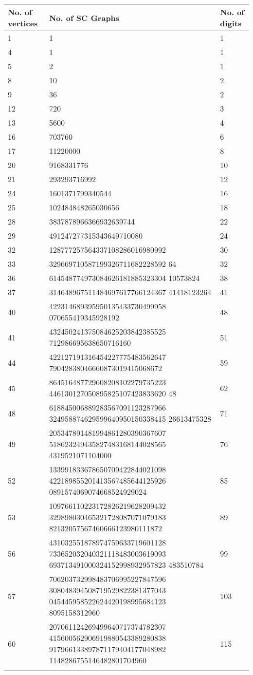 \documentclass[12pt,conference]{IEEEtran}
\begin{document}
\newpage
\fontsize{10}{12} \selectfont
\begin{center} 
\begin{tabular}{ |p{1.1cm} | p{5.3cm} | p{1.1cm}|}
  \hline
  No. of vertices& No. of SC Graphs & No. of digits \\ \hline
1 & 1 & 1 \\ \hline
4 & 1 & 1 \\ \hline
5 & 2 & 1 \\ \hline
8 & 10 & 2 \\ \hline
9 & 36 & 2 \\ \hline
12 & 720 & 3 \\ \hline
13 & 5600 & 4 \\ \hline
16 & 703760 & 6 \\ \hline
17 & 11220000 & 8 \\ \hline
20 & 9168331776 & 10 \\ \hline
21 & 293293716992 & 12 \\ \hline
24 & 1601371799340544 & 16 \\ \hline
25 & 102484848265030656 & 18 \\ \hline
28 & 3837878966366932639744 & 22 \\ \hline
29 & 491247277315343649710080 & 24 \\ \hline
32 & 128777257564337108286016980992  & 30 \\ \hline
33 & 329669710587199326711682228592 64 & 32 \\ \hline
36 & 614548774973084626181885323304 10573824 & 38 \\ \hline
37 & 314648967511484697617766124367 41418123264 & 41 \\ \hline
40 & 422314689395950135433730499958 070655419345928192 & 48 \\ \hline
41 & 432450241375084625203842385525 712986695638650716160 & 51 \\ \hline
44 & 422127191316454227775483562647 79042838046660873019415068672 & 59 \\ \hline
45 & 864516487729608208102279735223 446130127050895825107423833620 48 & 62 \\ \hline
48 & 618845006889283567091123287966 324958874629599640950150338415 26613475328 & 71 \\ \hline 
49 & 205347891481994861280390367607 518623249435827483168144028565 4319521071104000 & 76 \\ \hline 
52 & 133991833678650709422844021098 422189855201413567485644125926 0891574069074668524929024 & 85 \\ \hline 
53 & 109766110223172826219628209432 329898030465321728087071079183 82132057567460666123980111872 & 89 \\ \hline 
56 & 431032551878974759633719601128 733652032040321118483003619093 693713491000324152998932957823 483510784 & 99 \\ \hline 
57 & 706203732998483706995227847596 308048394508719529822381377043 045445958522624420198995684123 8095158312960 & 103 \\ \hline 
60 & 207061124269499640717374782307 415600562906919880543389280838 917966133897871179404177048982 1148286755146482801704960 & 115 \\  
& & \\ \hline 
  

\end{tabular}
\end{center}
\end{document}
